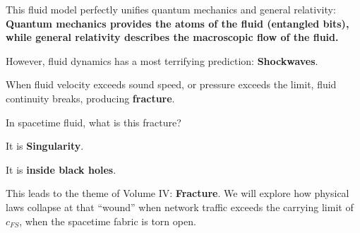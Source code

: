 This fluid model perfectly unifies quantum mechanics and general relativity: \textbf{Quantum mechanics provides the atoms of the fluid (entangled bits), while general relativity describes the macroscopic flow of the fluid.}

However, fluid dynamics has a most terrifying prediction: \textbf{Shockwaves}.

When fluid velocity exceeds sound speed, or pressure exceeds the limit, fluid continuity breaks, producing \textbf{fracture}.

In spacetime fluid, what is this fracture?

It is \textbf{Singularity}.

It is \textbf{inside black holes}.

This leads to the theme of Volume IV: \textbf{Fracture}. We will explore how physical laws collapse at that ``wound'' when network traffic exceeds the carrying limit of $c_{FS}$, when the spacetime fabric is torn open.

